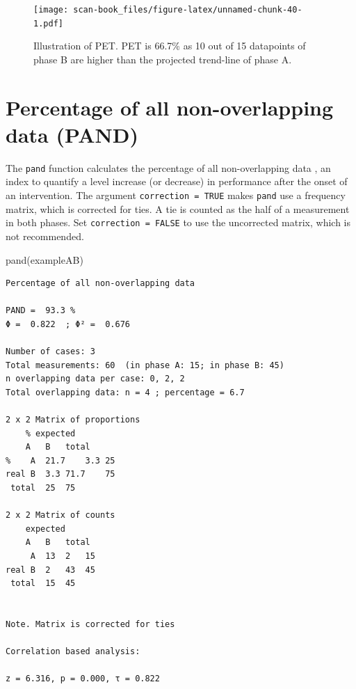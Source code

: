 \documentclass[
]{book}
\newenvironment{Shaded}{\begin{snugshade}}{\end{snugshade}}
\newcommand{\FunctionTok}[1]{\textcolor[rgb]{0.00,0.00,0.00}{#1}}
\newcommand{\NormalTok}[1]{#1}
\begin{document}
\begin{figure}
\centering
\texttt{[image: scan-book\_files/figure-latex/unnamed-chunk-40-1.pdf]}
\caption{\label{fig:unnamed-chunk-40}Illustration of PET. PET is 66.7\% as 10 out of 15 datapoints of phase B are higher than the projected trend-line of phase A.}
\end{figure}

\hypertarget{percentage-of-all-non-overlapping-data-pand}{%
\section{Percentage of all non-overlapping data (PAND)}\label{percentage-of-all-non-overlapping-data-pand}}

The \texttt{pand} function calculates the percentage of all non-overlapping data \citep{parker_percentage_2007}, an index to quantify a level increase (or decrease) in performance after the onset of an intervention. The argument \texttt{correction\ =\ TRUE} makes \texttt{pand} use a frequency matrix, which is corrected for ties. A tie is counted as the half of a measurement in both phases. Set \texttt{correction\ =\ FALSE} to use the uncorrected matrix, which is not recommended.

\begin{Shaded}
\begin{Highlighting}[]
\FunctionTok{pand}\NormalTok{(exampleAB)}
\end{Highlighting}
\end{Shaded}

\begin{verbatim}
Percentage of all non-overlapping data

PAND =  93.3 %
Φ =  0.822  ; Φ² =  0.676 

Number of cases: 3 
Total measurements: 60  (in phase A: 15; in phase B: 45)
n overlapping data per case: 0, 2, 2
Total overlapping data: n = 4 ; percentage = 6.7 

2 x 2 Matrix of proportions
    % expected
    A   B   total
%    A  21.7    3.3 25
real B  3.3 71.7    75
 total  25  75

2 x 2 Matrix of counts
    expected
    A   B   total
     A  13  2   15
real B  2   43  45
 total  15  45


Note. Matrix is corrected for ties

Correlation based analysis:

z = 6.316, p = 0.000, τ = 0.822 
\end{verbatim}
\end{document}
